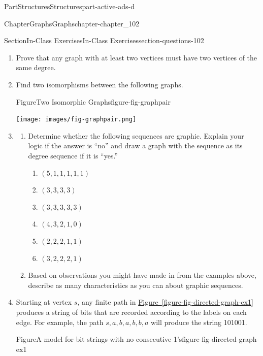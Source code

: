 \documentclass[oneside,10pt,]{book}
\newcommand{\xreffont}{\relax}
\numberwithin{equation}{section}
\begin{document}
\begin{partptx}{Part}{Structures}{}{Structures}{}{}{part-active-ads-d}
\begin{chapterptx}{Chapter}{Graphs}{}{Graphs}{}{}{chapter-chapter_102}
\typeout{************************************************}
%
\begin{sectionptx}{Section}{In-Class Exercises}{}{In-Class Exercises}{}{}{section-questions-102}
%
\begin{enumerate}[label=\arabic*.]
\item{}Prove that any graph with at least two vertices must have two vertices of the same degree.%
\item{}Find two isomorphisms between the following graphs.%
\begin{figureptx}{Figure}{Two Isomorphic Graphs}{figure-fig-graphpair}{}%
\begin{image}{0.15}{0.7}{0.15}{}%
\texttt{[image: images/fig-graphpair.png]}
\end{image}%
\tcblower
\end{figureptx}%
\item{}%
\begin{enumerate}[label=(\alph*)]
\item{}Determine whether the following sequences are graphic. Explain your logic if the answer is ``no'' and draw a graph with the sequence as its degree sequence if it is ``yes.''%
\begin{enumerate}[label=\roman*]
\item{}\(\displaystyle (5,1,1,1,1,1)\)%
\item{}\(\displaystyle (3,3,3,3)\)%
\item{}\(\displaystyle (3,3,3,3,3)\)%
\item{}\(\displaystyle (4,3,2,1,0)\)%
\item{}\(\displaystyle (2,2,2,1,1)\)%
\item{}\(\displaystyle (3,2,2,2,1)\)%
\end{enumerate}
%
\item{}Based on observations you might have made in from the examples above, describe as many characteristics as you can about graphic sequences.%
\end{enumerate}
%
\item{}Starting at vertex \(s\), any finite path in \hyperref[figure-fig-directed-graph-ex1]{Figure~{\xreffont\ref{figure-fig-directed-graph-ex1}}} produces a string of bits that are recorded according to the labels on each edge.  For example, the path \(s,a,b,a,b,b,a\) will produce the string 101001.%
\begin{figureptx}{Figure}{A model for bit strings with no consecutive 1's}{figure-fig-directed-graph-ex1}{}%
\begin{image}{0.15}{0.7}{0.15}{}%

\end{image}
\end{figureptx}
\end{enumerate}
\end{sectionptx}
\end{chapterptx}
\end{partptx}
\end{document}

